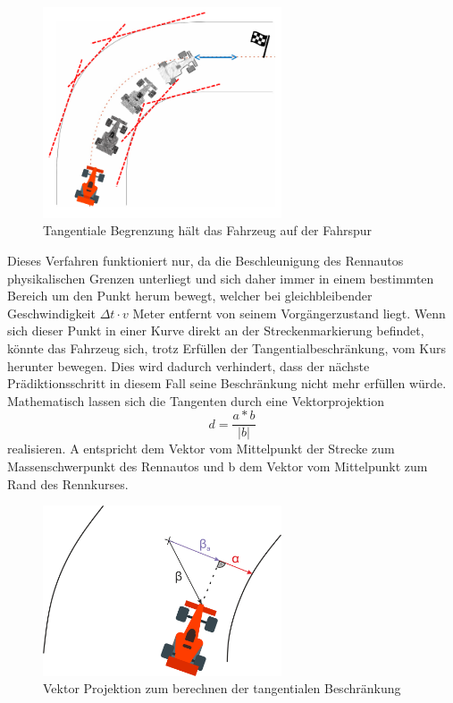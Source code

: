 \documentclass{like}
\begin{document}
\begin{figure}[ht!]
	\centering
	\includegraphics[width=200pt]{Abbildungen/tangentialConstraint.png}
	\caption{Tangentiale Begrenzung hält das Fahrzeug auf der Fahrspur}
	\label{fig:costGoalDist}
\end{figure}
Dieses Verfahren funktioniert nur, da die Beschleunigung des Rennautos physikalischen Grenzen unterliegt und sich daher immer in einem bestimmten Bereich um den Punkt herum bewegt, welcher bei gleichbleibender Geschwindigkeit $\Delta t \cdot v$ Meter entfernt von seinem Vorgängerzustand liegt. Wenn sich dieser Punkt in einer Kurve direkt an der Streckenmarkierung befindet, könnte das Fahrzeug sich, trotz Erfüllen der Tangentialbeschränkung, vom Kurs herunter bewegen. Dies wird dadurch verhindert, dass der nächste Prädiktionsschritt in diesem Fall seine Beschränkung nicht mehr erfüllen würde.
Mathematisch lassen sich die Tangenten durch eine Vektorprojektion 
\begin{equation}
	d = \frac{a*b}{|b|}
\end{equation}
realisieren. A entspricht dem Vektor vom Mittelpunkt der Strecke zum Massenschwerpunkt des Rennautos und b dem Vektor vom Mittelpunkt zum Rand des Rennkurses. 

\begin{figure}[ht!]
	\centering
	\includegraphics[width=200pt]{Abbildungen/vektorProjection.png}
	\caption{Vektor Projektion zum berechnen der tangentialen Beschränkung}
	\label{fig:vektorProjektion}
\end{figure}
\end{document}
